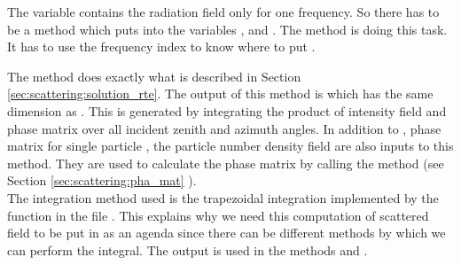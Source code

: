 The variable  contains the radiation field only
for one frequency. So there has to be a method which puts
 into the variables ,
 and . The method
 is doing this task.
It has to use the frequency index to know where
to put .
 

\label{sec:scattering:sca_fieldCalc}
The method  does exactly what is
described in Section 
\ref{sec:scattering:solution_rte}.  The output of this method is
 which has the same dimension as
.  This is generated by integrating the product of
intensity field  and phase matrix
 over all incident zenith and azimuth angles.  In
addition to , phase matrix for single 
particle , the particle number density field
 are also inputs to this method.  They are used
to calculate the phase matrix  by calling the
method (see Section
\ref{sec:scattering:pha_mat} ). \\ 
The integration method used is the trapezoidal integration implemented
by the function  in the file
.  This explains why we need this
computation of scattered field to be
put in as an agenda since there can be different methods by which we
can perform the integral. 
The output  is used in the
methods  and .

\label{sec:scattering:RT_methods}

